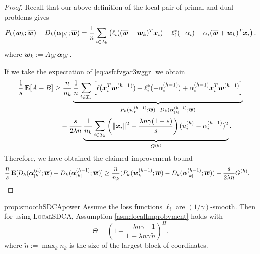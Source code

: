 \documentclass{article} %
\newcommand{\localSDCA}{\textsc{LocalSDCA}\xspace}
\begin{document}
\begin{proof}
Recall that our above definition of the local pair of primal and dual problems gives
\begin{align*}
 P_k ( {\bm{w}}_k; \overline{{\bm{w}}})
 -
  D_k (  \bm{\alpha}_{[k]}; \overline{{\bm{w}}})
=
  \frac1{n} \sum_{i \in \mathcal{I}_k}
  \left(
  \ell_i( (\overline{{\bm{w}}}+  {\bm{w}}_k)^T \bm{x}_i )
  + \ell^*_i( -\alpha_i)
+\alpha_i (\overline{{\bm{w}}}+  {\bm{w}}_k)^T \bm{x}_i
  \right).
\end{align*}
where  ${\bm{w}}_k := A_{[k]}\bm{\alpha}_{[k]}$.%

If we take the expectation of \eqref{eq:asfcfvgar3wggr}
we obtain
\begin{align*}
\frac1s \operatorname*{\mathbf{E}}[A-B]
&\geq
\frac{n}{n_k}
\underbrace{
\frac1n
 \sum_{i \in \mathcal{I}_k}
  \left[ \ell(\bm{x}_i^T {\bm{w}}^{(h-1)} )
+    \ell_i^*(-\alpha_i^{(h-1)})
+    \alpha_i^{(h-1)}  \bm{x}_i^T {\bm{w}}^{(h-1)}
\right]}_{ P_k (  w_k^{(h-1)}; \overline{{\bm{w}}})
 -
  D_k (  \bm{\alpha}_{[k]}^{(h-1)}; \overline{{\bm{w}}})}
\\&\quad -
\frac{s}{2\lambda n}
\underbrace{\frac{1}{n_k}
 \sum_{i \in \mathcal{I}_k}
 \left(
  \|     \bm{x}_i\|^2 -
   \frac{ \lambda n  \gamma(1-s)}{s}
 \right)
  (u_i^{(h)}- \alpha_i^{(h-1)})^2}_{G^{(h)}}.
\end{align*}
Therefore, we have obtained the claimed improvement bound
\begin{align*}
\frac ns \operatorname*{\mathbf{E}}[ D_k (  \bm{\alpha}_{[k]}^{(h)}; \overline{{\bm{w}}})
 -
 D_k (  \bm{\alpha}_{[k]}^{(h-1)}; \overline{{\bm{w}}})]
&\geq
\frac{n}{n_k}
(P_k (  {\bm{w}}_k^{(h-1)}; \overline{{\bm{w}}})
 -
  D_k (  \bm{\alpha}_{[k]}^{(h-1)}; \overline{{\bm{w}}}))
   -
\frac{s}{2\lambda n}
G^{(h)}.
\end{align*}
\end{proof}


\begin{repproposition}{prop:smoothSDCApower}
Assume the loss functions $\ell_i$ are $(1/\gamma)$-smooth. Then for using \localSDCA, Assumption \ref{asm:localImprobvment} holds with\vspace{-2mm}
\begin{equation}%
 \Theta = \left(  1-\frac{\lambda n \gamma}{1+\lambda n \gamma} \frac1{\tilde n} \right)^H.
\end{equation}
where $\tilde n := \max_k n_k$ is the size of the largest block of coordinates.\end{repproposition}
\end{document}
